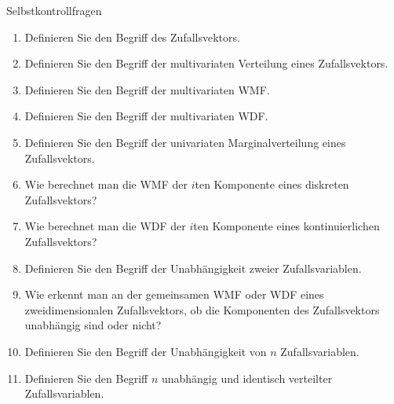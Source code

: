 \documentclass[
  8pt,
  ignorenonframetext,
]{beamer}
\providecommand{\tightlist}{%
  \setlength{\itemsep}{0pt}\setlength{\parskip}{0pt}}
\begin{document}
\begin{frame}{Selbstkontrollfragen}
\protect\hypertarget{selbstkontrollfragen}{}

\small

\begin{enumerate}
\tightlist
\item
  \justifying Definieren Sie den Begriff des Zufallsvektors.
\item
  Definieren Sie den Begriff der multivariaten Verteilung eines
  Zufallsvektors.
\item
  Definieren Sie den Begriff der multivariaten WMF.
\item
  Definieren Sie den Begriff der multivariaten WDF.
\item
  Definieren Sie den Begriff der univariaten Marginalverteilung eines
  Zufallsvektors.
\item
  Wie berechnet man die WMF der \(i\)ten Komponente eines diskreten
  Zufallsvektors?
\item
  Wie berechnet man die WDF der \(i\)ten Komponente eines
  kontinuierlichen Zufallsvektors?
\item
  Definieren Sie den Begriff der Unabhängigkeit zweier Zufallsvariablen.
\item
  Wie erkennt man an der gemeinsamen WMF oder WDF eines
  zweidimensionalen Zufallsvektors, ob die Komponenten des
  Zufallsvektors unabhängig sind oder nicht?
\item
  Definieren Sie den Begriff der Unabhängigkeit von \(n\)
  Zufallsvariablen.
\item
  Definieren Sie den Begriff \(n\) unabhängig und identisch verteilter
  Zufallsvariablen.
\end{enumerate}
\end{frame}
\end{document}
